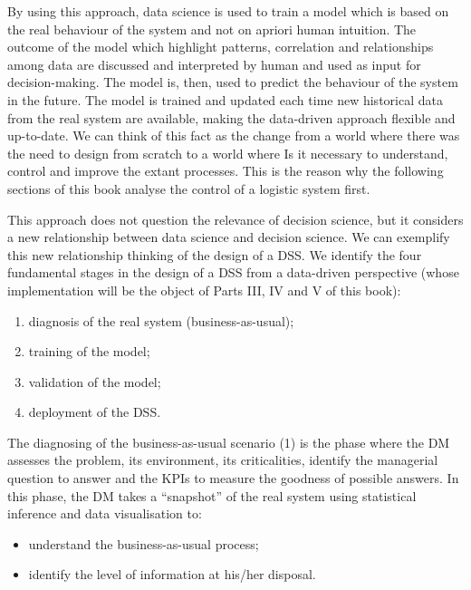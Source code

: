 By using this approach, data science is used to train a model which is based on the real behaviour of the system and not on apriori human intuition. The outcome of the model which highlight patterns, correlation and relationships among data are discussed and interpreted by human and used as input for decision-making. The model is, then, used to predict the behaviour of the system in the future. The model is trained and updated each time new historical data from the real system are available, making the data-driven approach flexible and up-to-date. We can think of this fact as the change from a world where there was the need to design from scratch to a world where Is it necessary to understand, control and improve the extant processes. This is the reason why the following sections of this book analyse the control of a logistic system first.\par

This approach does not question the relevance of decision science, but it considers a new relationship between data science and decision science. We can exemplify this new relationship thinking of the design of a DSS. We identify the four fundamental stages in the design of a DSS from a data-driven perspective (whose implementation will be the object of Parts III, IV and V of this book):

\begin{enumerate}
    \item diagnosis of the real system (business-as-usual);
    \item training of the model;
    \item validation of the model;
    \item deployment of the DSS.

\end{enumerate}

The diagnosing of the business-as-usual scenario (1) is the phase where the DM assesses the problem, its environment, its criticalities, identify the managerial question to answer and the KPIs to measure the goodness of possible answers. In this phase, the DM takes a “snapshot” of the real system using statistical inference and data visualisation to:

\begin{itemize}
    \item understand the business-as-usual process;
    \item identify the level of information at his/her disposal.

\end{itemize}

